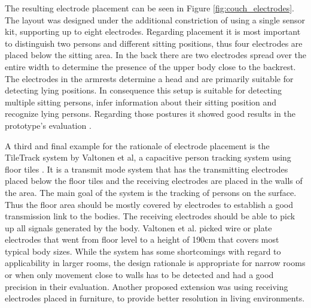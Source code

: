 The resulting electrode placement can be seen in Figure \ref{fig:couch_electrodes}. The layout was designed under the additional constriction of using a single sensor kit, supporting up to eight electrodes. Regarding placement it is most important to distinguish two persons and different sitting positions, thus four electrodes are placed below the sitting area. In the back there are two electrodes spread over the entire width to determine the presence of the upper body close to the backrest. The electrodes in the armrests determine a head and are primarily suitable for detecting lying positions. In consequence this setup is suitable for detecting multiple sitting persons, infer information about their sitting position and recognize lying persons. Regarding those postures it showed good results in the prototype's evaluation \cite{Couch2011}.
 
A third and final example for the rationale of electrode placement is the TileTrack system by Valtonen et al, a capacitive person tracking system using floor tiles \cite{Valtonen2009a}. It is a transmit mode system that has the transmitting electrodes placed below the floor tiles and the receiving electrodes are placed in the walls of the area. The main goal of the system is the tracking of persons on the surface. Thus the floor area should be mostly covered by electrodes to establish a good transmission link to the bodies. The receiving electrodes should be able to pick up all signals generated by the body. Valtonen et al. picked wire or plate electrodes that went from floor level to a height of 190cm that covers most typical body sizes. While the system has some shortcomings with regard to applicability in larger rooms, the design rationale is appropriate for narrow rooms or when only movement close to walls has to be detected and had a good precision in their evaluation. Another proposed extension was using receiving electrodes placed in furniture, to provide better resolution in living environments.

